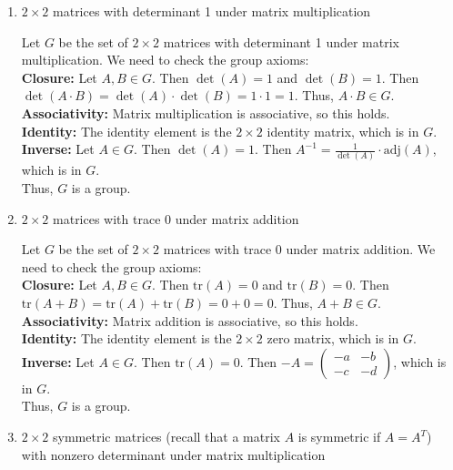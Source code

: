 \documentclass[10pt,twoside]{article}
\begin{document}
\begin{itemize}
\begin{enumerate}
\begin{enumerate}
\begin{solution}
            \end{solution}
			\item $2 \times 2$ matrices with determinant 1 under matrix multiplication
			\begin{solution}
                Let $G$ be the set of $2 \times 2$ matrices with determinant 1 under matrix multiplication. We need to check the group axioms: \\ 
                \textbf{Closure:} Let $A, B \in G$. Then $\det(A) = 1$ and $\det(B) = 1$. Then $\det(A \cdot B) = \det(A) \cdot \det(B) = 1 \cdot 1 = 1$. Thus, $A \cdot B \in G$. \\
                \textbf{Associativity:} Matrix multiplication is associative, so this holds. \\
                \textbf{Identity:} The identity element is the $2 \times 2$ identity matrix, which is in $G$. \\
                \textbf{Inverse:} Let $A \in G$. Then $\det(A) = 1$. Then $A^{-1} = \frac{1}{\det(A)} \cdot \text{adj}(A)$, which is in $G$. \\
                Thus, $G$ is a group.
            \end{solution}
			\item $2 \times 2$ matrices with trace 0 under matrix addition
			\begin{solution}
                Let $G$ be the set of $2 \times 2$ matrices with trace 0 under matrix addition. We need to check the group axioms: \\ 
                \textbf{Closure:} Let $A, B \in G$. Then $\text{tr}(A) = 0$ and $\text{tr}(B) = 0$. Then $\text{tr}(A + B) = \text{tr}(A) + \text{tr}(B) = 0 + 0 = 0$. Thus, $A + B \in G$. \\
                \textbf{Associativity:} Matrix addition is associative, so this holds. \\
                \textbf{Identity:} The identity element is the $2 \times 2$ zero matrix, which is in $G$. \\
                \textbf{Inverse:} Let $A \in G$. Then $\text{tr}(A) = 0$. Then $-A = \begin{pmatrix} -a & -b \\ -c & -d \end{pmatrix}$, which is in $G$. \\
                Thus, $G$ is a group.
            \end{solution}
			\item $2 \times 2$ symmetric matrices (recall that a matrix $A$ is symmetric if $A = A^T$) with nonzero determinant under matrix multiplication

\end{enumerate}
\end{enumerate}
\end{itemize}
\end{document}
